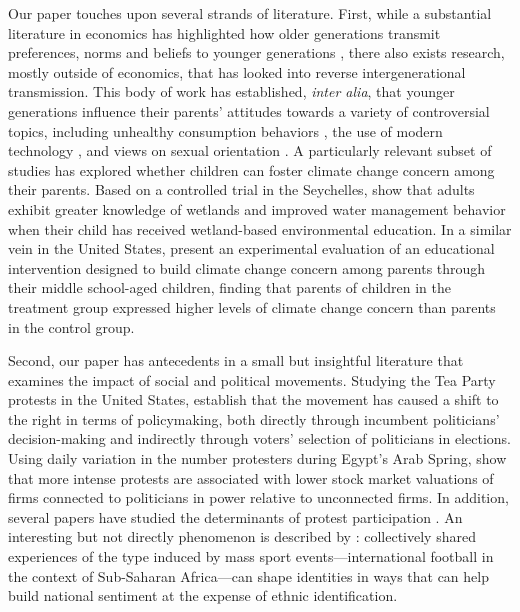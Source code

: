 Our paper touches upon several strands of literature. First, while a substantial literature in economics has highlighted how older generations transmit preferences, norms and beliefs to younger generations  \citep{bisin2001economics,fernandez2004mothers,fernandez2009culture,figlio2019longterm}, there also exists research, mostly outside of economics, that has looked into reverse intergenerational transmission. This body of work has established, \emph{inter alia}, that younger generations influence their parents' attitudes towards a variety of controversial topics, including unhealthy consumption behaviors \citep{flurry2005children}, the use of modern technology \citep{baily2009reverse}, and views on sexual orientation \citep{lasala2000lesbians}. A particularly relevant subset of studies has explored whether children can foster climate change concern among their parents. Based on a controlled trial in the Seychelles, \citet{damerell2013child} show that adults exhibit greater knowledge of wetlands and improved water management behavior when their child has received wetland-based environmental education. In a similar vein in the United States, \citet{lawson2019children}  present an experimental evaluation of an educational intervention designed to build climate change concern among parents through their middle school-aged children, finding that parents of children in the treatment group expressed higher levels of climate change concern than parents in the control group. 


Second, our paper has antecedents in a small but insightful literature that examines the impact of social and political movements. Studying the Tea Party protests in the United States, \citet{madestam2013political} establish that the movement has caused a shift to the right in terms of policymaking, both directly through incumbent politicians' decision-making and indirectly through voters' selection of politicians in elections. Using daily variation in the number protesters during Egypt's Arab Spring, \citep{acemoglu2018power} show that more intense protests are associated with lower stock market valuations of firms connected to politicians in power relative to unconnected firms. In addition, several papers have studied the determinants of protest participation \citep{finkel1991party,finkel1998rational,cantoni2019protests,bursztyn2020persistent}. An interesting but not directly phenomenon is described by \citet{depetris2020building}: collectively  shared  experiences  of  the  type  induced  by  mass sport events---international  football  in the context of Sub-Saharan Africa---can  shape  identities  in  ways  that  can  help  build  national  sentiment  at  the  expense  of  ethnic  identification.  


